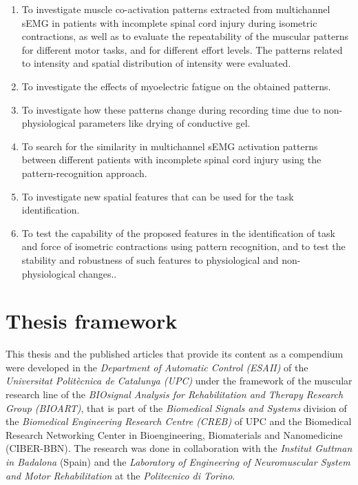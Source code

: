 \begin{enumerate}[I]

\item To investigate muscle co-activation patterns extracted from multichannel sEMG in patients with incomplete spinal cord injury during isometric contractions, as well as to evaluate the repeatability of the muscular patterns for different motor tasks, and for different effort levels. The patterns related to intensity and spatial distribution of intensity were evaluated.

\item To investigate the effects of myoelectric fatigue on the obtained patterns.

\item To investigate how these patterns change during recording time due to non-physiological parameters like drying of conductive gel.

\item To search for the similarity in multichannel sEMG activation patterns between different patients with incomplete spinal cord injury using the pattern-recognition approach.

\item To investigate new spatial features that can be used for the task identification.

\item To test the capability of the proposed features in the identification of task and force of isometric contractions using pattern recognition, and to test the stability and robustness of such features to physiological and non-physiological changes..


\end{enumerate}

     \section{Thesis framework}
     
This thesis and the published articles that provide its content as a compendium were developed in the \emph{Department of Automatic Control (ESAII)} of the \emph{Universitat Polit\`{e}cnica de Catalunya (UPC)} under the framework of the muscular research line of the \emph{BIOsignal Analysis for Rehabilitation and Therapy Research Group (BIOART)}, that is part of the \emph{Biomedical Signals and Systems} division of the \emph{Biomedical Engineering Research Centre (CREB)} of UPC and the Biomedical Research Networking Center in Bioengineering, Biomaterials and Nanomedicine (CIBER-BBN). The research was done in collaboration with the \emph{Institut Guttman in Badalona} (Spain) and the \emph{Laboratory of Engineering of Neuromuscular System and Motor Rehabilitation} at the \emph{Politecnico di Torino}.


